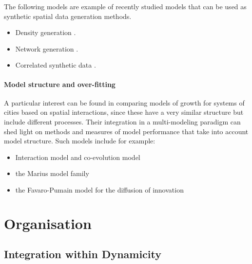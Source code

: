 The following models are example of recently studied models that can be used as synthetic spatial data generation methods.

\begin{itemize}
\item Density generation \cite{raimbault2017calibration}.
\item Network generation \cite{raimbault2018urban}.
\item Correlated synthetic data \cite{raimbault2016generation}.
\end{itemize}


\paragraph{Model structure and over-fitting}

A particular interest can be found in comparing models of growth for systems of cities based on spatial interactions, since these have a very similar structure but include different processes. Their integration in a multi-modeling paradigm can shed light on methods and measures of model performance that take into account model structure. Such models include for example:

\begin{itemize}
\item Interaction model \cite{raimbault2016generation} and co-evolution model \cite{raimbault2018models}
\item the Marius model family \cite{cottineau2015modular}
\item the Favaro-Pumain model for the diffusion of innovation \cite{favaro2011gibrat} 
\end{itemize}








\section{Organisation}


\subsection{Integration within Dynamicity}

